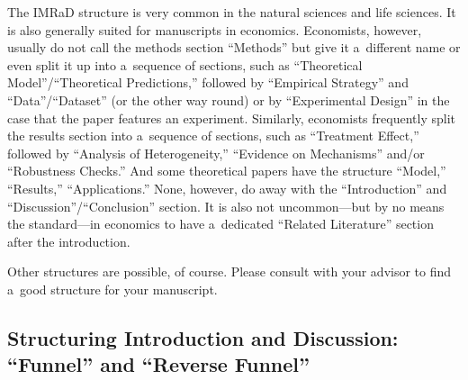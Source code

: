 The IMRaD structure is very common in the natural sciences and life sciences. It is also generally suited for manuscripts in economics. Economists, however, usually do not call the methods section ``Methods'' but give it a~different name or even split it up into a~sequence of sections, such as ``Theoretical Model''\slash ``Theoretical Predictions,'' followed by ``Empirical Strategy'' and ``Data''\slash ``Dataset'' (or the other way round) or by ``Experimental Design'' in the case that the paper features an experiment. Similarly, economists frequently split the results section into a~sequence of sections, such as ``Treatment Effect,'' followed by ``Analysis of Heterogeneity,'' ``Evidence on Mechanisms'' and\slash or ``Robustness Checks.'' And some theoretical papers have the structure ``Model,'' ``Results,'' ``Applications.'' None, however, do away with the ``Introduction'' and ``Discussion''\slash ``Conclusion'' section. It is also not uncommon---but by no means the standard---in economics to have a~dedicated ``Related Literature'' section after the intro\-duction.

Other structures are possible, of course. Please consult with your advisor to find a~good structure for your manuscript.

\subsection{Structuring Introduction and Discussion: ``Funnel'' and ``Reverse Funnel''}

\begingroup

\let \longtblrOrig \longtblr
\renewcommand{\longtblr}{%
	\fontsize{\fsnormal}{\smalllinespacing}\selectfont%
	\longtblrOrig%
}

